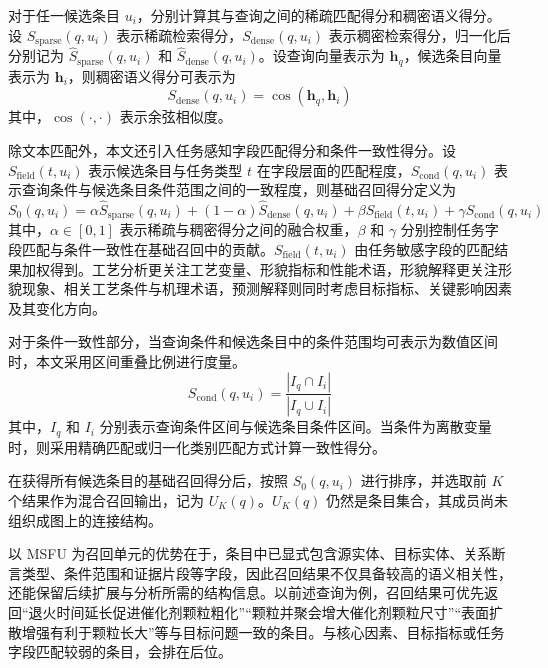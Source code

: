 对于任一候选条目 $u_i$，分别计算其与查询之间的稀疏匹配得分和稠密语义得分。设 $S_{\mathrm{sparse}}(q,u_i)$ 表示稀疏检索得分，$S_{\mathrm{dense}}(q,u_i)$ 表示稠密检索得分，归一化后分别记为 $\hat{S}_{\mathrm{sparse}}(q,u_i)$ 和 $\hat{S}_{\mathrm{dense}}(q,u_i)$。设查询向量表示为 $\mathbf{h}_q$，候选条目向量表示为 $\mathbf{h}_i$，则稠密语义得分可表示为
\begin{equation}
    S_{\mathrm{dense}}(q,u_i)=\cos(\mathbf{h}_q,\mathbf{h}_i)
\end{equation}
其中，$\cos(\cdot,\cdot)$ 表示余弦相似度。

除文本匹配外，本文还引入任务感知字段匹配得分和条件一致性得分。设 $S_{\mathrm{field}}(t,u_i)$ 表示候选条目与任务类型 $t$ 在字段层面的匹配程度，$S_{\mathrm{cond}}(q,u_i)$ 表示查询条件与候选条目条件范围之间的一致程度，则基础召回得分定义为
\begin{equation}
    S_{0}(q,u_i)=
    \alpha \hat{S}_{\mathrm{sparse}}(q,u_i)
    +(1-\alpha)\hat{S}_{\mathrm{dense}}(q,u_i)
    +\beta S_{\mathrm{field}}(t,u_i)
    +\gamma S_{\mathrm{cond}}(q,u_i)
\end{equation}
其中，$\alpha \in [0,1]$ 表示稀疏与稠密得分之间的融合权重，$\beta$ 和 $\gamma$ 分别控制任务字段匹配与条件一致性在基础召回中的贡献。$S_{\mathrm{field}}(t,u_i)$ 由任务敏感字段的匹配结果加权得到。工艺分析更关注工艺变量、形貌指标和性能术语，形貌解释更关注形貌现象、相关工艺条件与机理术语，预测解释则同时考虑目标指标、关键影响因素及其变化方向。

对于条件一致性部分，当查询条件和候选条目中的条件范围均可表示为数值区间时，本文采用区间重叠比例进行度量。
\begin{equation}
    S_{\mathrm{cond}}(q,u_i)=\frac{|I_q \cap I_i|}{|I_q \cup I_i|}
\end{equation}
其中，$I_q$ 和 $I_i$ 分别表示查询条件区间与候选条目条件区间。当条件为离散变量时，则采用精确匹配或归一化类别匹配方式计算一致性得分。

在获得所有候选条目的基础召回得分后，按照 $S_0(q,u_i)$ 进行排序，并选取前 $K$ 个结果作为混合召回输出，记为 $U_K(q)$。$U_K(q)$ 仍然是条目集合，其成员尚未组织成图上的连接结构。

以 MSFU 为召回单元的优势在于，条目中已显式包含源实体、目标实体、关系断言类型、条件范围和证据片段等字段，因此召回结果不仅具备较高的语义相关性，还能保留后续扩展与分析所需的结构信息。以前述查询为例，召回结果可优先返回“退火时间延长促进催化剂颗粒粗化”“颗粒并聚会增大催化剂颗粒尺寸”“表面扩散增强有利于颗粒长大”等与目标问题一致的条目。与核心因素、目标指标或任务字段匹配较弱的条目，会排在后位。

